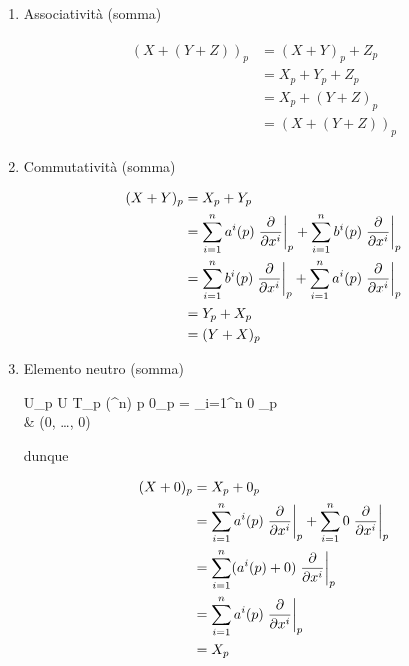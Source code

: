 \begin{enumerate}
	\item Associatività (somma)
	
	\begin{align}
		\begin{split}
			(X + (Y + Z))_{p} &= (X + Y)_{p} + Z_{p}\\
			&= X_{p} + Y_{p} + Z_{p}\\
			&= X_{p} + (Y + Z)_{p}\\
			&= (X + (Y + Z))_{p}
		\end{split}
	\end{align}
	
	\item Commutatività (somma)
	
	\begin{align}
		\begin{split}
			(X + Y)_{p} &= X_{p} + Y_{p}\\
			&= \sum_{i=1}^{n} a^{i} (p) \eval{ \pdv{x^{i}} }_{p} + \sum_{i=1}^{n} b^{i} (p) \eval{ \pdv{x^{i}} }_{p}\\
			&= \sum_{i=1}^{n} b^{i} (p) \eval{ \pdv{x^{i}} }_{p} + \sum_{i=1}^{n} a^{i} (p) \eval{ \pdv{x^{i}} }_{p}\\
			&= Y_{p} + X_{p}\\
			&= (Y + X)_{p}
		\end{split}
	\end{align}
	
	\item Elemento neutro (somma)
	
		{U}{\bigsqcup_{p \in U} T_{p} (\R^{n})}
		{p}{%
			0_{p} = \sum_{i=1}^{n} 0 _{p}\\
			& (0, \dots, 0)%
		}
	
	dunque
	
	\begin{align}
		\begin{split}
			(X + 0)_{p} &= X_{p} + 0_{p}\\
			&= \sum_{i=1}^{n} a^{i} (p) \eval{ \pdv{x^{i}} }_{p} + \sum_{i=1}^{n} 0 \eval{ \pdv{x^{i}} }_{p}\\
			&= \sum_{i=1}^{n} (a^{i} (p) + 0) \eval{ \pdv{x^{i}} }_{p}\\
			&= \sum_{i=1}^{n} a^{i} (p) \eval{ \pdv{x^{i}} }_{p}\\
			&= X_{p}
		\end{split}
	\end{align}
	

\end{enumerate}

